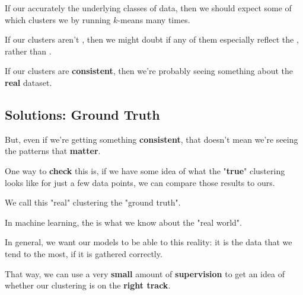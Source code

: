         \begin{concept}
            If our  accurately  the underlying classes of data, then we should expect some  of which clusters we  by running $k$-means many times.
            
            If our clusters aren't , then we might doubt if any of them especially reflect the , rather than .
        \end{concept}

        If our clusters are \textbf{consistent}, then we're probably seeing something about the \textbf{real} dataset.
    
    \subsection*{Solutions: Ground Truth}
    
        But, even if we're getting something \textbf{consistent}, that doesn't mean we're seeing the patterns that \textbf{matter}. 
        
        One way to \textbf{check} this is, if we have some idea of what the "\textbf{true}" clustering looks like for just a few data points, we can compare those results to ours.
        
        We call this "real" clustering the "ground truth".\\
        
        \begin{definition}
            In machine learning, the  is what we know about the "real world".
            
            In general, we want our models to be able to  this reality: it is the data that we tend to  the most, if it is gathered correctly.
        \end{definition}
        
        That way, we can use a very \textbf{small} amount of \textbf{supervision} to get an idea of whether our clustering is on the \textbf{right track}.
    
